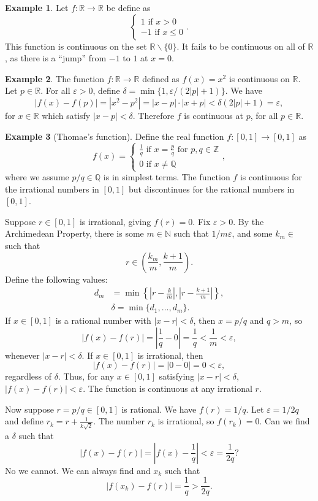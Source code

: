 \documentclass{article}
\newcommand{\N}{\mathbb{N}}
\newcommand{\R}{\mathbb{R}}
\newcommand{\Q}{\mathbb{Q}}
\newcommand{\Z}{\mathbb{Z}}
\theoremstyle{definition}
\newtheorem{example}{Example}[section]
\begin{document}
\begin{example}
	Let $ f:\R\to\R $ be define as $$ \begin{cases}
	1\text{ if }x>0\\-1\text{ if }x\le0
	\end{cases} .$$
This function is continuous on the set $ \R\backslash\{0\} $. It fails to be continuous on all of $ \R $, as there is a ``jump'' from $ -1 $ to $ 1 $ at $ x=0 $. 	
\end{example}
\begin{example}
	The function $ f:\R\to\R $ defined as $ f(x)=x^2 $ is continuous on $ \R $. Let $ p\in\R $. For all $ \varepsilon>0 $, define $ \delta=\min\{1,\varepsilon/(2|p|+1)\} $. We have $$|f(x)-f(p)|=|x^2-p^2|=|x-p|\cdot|x+p|<\delta(2|p|+1)=\varepsilon ,$$ for $ x\in \R $ which satisfy $ |x-p|<\delta $.  Therefore $ f $ is continuous at $ p $, for all $ p\in\R $. 
\end{example}
\begin{example}[Thomae's function]
	Define the real function $ f:[0,1]\to[0,1] $ as $$f(x)=\begin{cases}
	\frac{1}{q} \text{ if }x=\frac{p}{q}\text{ for }p,q\in\Z\\
	0\text{ if }x\neq\Q
	\end{cases} ,$$ where we assume $ p/q\in\Q $ is in simplest terms. The function $ f $ is continuous for the irrational numbers in $ [0,1] $ but discontinues for the rational numbers in $ [0,1] $. 
	
	Suppose $ r\in[0,1] $ is irrational, giving $ f(r)=0 $. Fix $ \varepsilon>0 $. By the Archimedean Property, there is some $ m\in\N $ such that $ 1/m \varepsilon$, and some $ k_m\in $ such that $$ r\in\left(\frac{k_m}{m},\frac{k+1}{m}\right) .$$ Define the following values:
	\begin{align*}
		d_m&=\min\left\{\left\lvert r-\frac{k}{m}\right\rvert,\left\lvert r-\frac{k+1}{m}\right\rvert\right\},\\
		&\delta=\min\{d_1,\ldots,d_m\}.
	\end{align*}
	 If $ x\in[0,1] $ is a rational number with $ |x-r|<\delta $, then $ x=p/q $ and $ q>m $, so $$|f(x)-f(r)|=\left\lvert \frac{1}{q}-0\right\rvert=\frac{1}{q}<\frac{1}{m}<\varepsilon ,$$ whenever $ |x-r|<\delta $. If $ x\in[0,1] $ is irrational, then $$ |f(x)-f(r)|=|0-0|=0<\varepsilon ,$$ regardless of $ \delta $. Thus, for any $ x\in[0,1] $ satisfying $ |x-r|<\delta $, $ |f(x)-f(r)|<\varepsilon $. The function is continuous at any irrational $ r $.
	 
	 Now suppose $ r=p/q\in[0,1] $ is rational. We have $ f(r)=1/q $. Let $ \varepsilon=1/2q $ and define $ r_k=r+\frac{1}{k\sqrt{2}} $. The number $ r_k $ is irrational, so $ f(r_k)=0 $. Can we find a $ \delta $ such that $$ |f(x)-f(r)|=\left\lvert f(x)-\frac{1}{q}\right\rvert<\varepsilon=\frac{1}{2q}?$$ No we cannot. We can always find and $ x_k $ such that $$|f(x_k)-f(r)|=\frac{1}{q}>\frac{1}{2q}. $$  
\end{example}
\end{document}
